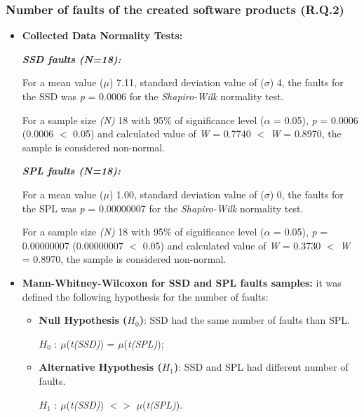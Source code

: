 \subsubsection{Number of faults of the created software products (R.Q.2)}


\begin{itemize}

\item \textbf{Collected Data Normality Tests:} 

\textbf{\textit{SSD faults (\textit{N}=18):}}

For a mean value ($\mu$) 7.11, standard deviation value of ($\sigma$) 4, the faults for the SSD was \textit{p} = 0.0006 for the \textit{Shapiro-Wilk} normality test.

For a sample size \textit{(N)} 18 with 95\% of significance level ($\alpha$ = 0.05), \textit{p} = 0.0006 (0.0006 $<$ 0.05) and calculated value of \textit{W} = 0.7740 $<$ \textit{W} = 0.8970, the sample is considered non-normal.



\textbf{\textit{SPL faults (\textit{N}=18):}}

For a mean value ($\mu$) 1.00, standard deviation value of ($\sigma$) 0, the faults for the SPL was \textit{p} = 0.00000007 for the \textit{Shapiro-Wilk} normality test.

For a sample size \textit{(N)} 18 with 95\% of significance level ($\alpha$ = 0.05), \textit{p} = 0.00000007 (0.00000007 $<$ 0.05) and calculated value of \textit{W} = 0.3730 $<$ \textit{W} = 0.8970, the sample is considered non-normal.





\item \textbf{Mann-Whitney-Wilcoxon for SSD and SPL faults samples:} it was defined the following hypothesis for the number of faults:


\begin{itemize}
  \item \textbf{Null Hypothesis ($H_{0}$)}: SSD had the same number of faults than SPL.	
	
	$H_{0}$ : $\mu$(\textit{t(SSD)}) = $\mu$(\textit{t(SPL)}); 
	
	\item \textbf{Alternative  Hypothesis ($H_{1}$)}: SSD and SPL had different number of faults.	
	
	$H_{1}$ :  $\mu$(\textit{t(SSD)}) $<>$ $\mu$(\textit{t(SPL)}).


\end{itemize}
\end{itemize}

